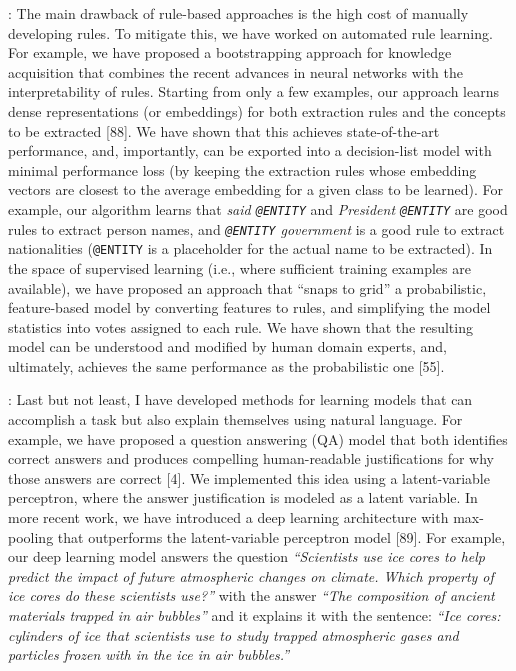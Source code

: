 \documentclass[10pt]{article}
\begin{document}
{}: The main drawback of rule-based approaches is the high cost of manually developing rules. To mitigate this, we have worked on automated rule learning. 
For example, we have proposed a bootstrapping approach for knowledge acquisition that combines the recent advances in neural networks with the interpretability of rules. Starting from only a few examples, our approach learns dense representations (or embeddings) for both extraction rules and the concepts to be extracted [88]. We have shown that this achieves state-of-the-art performance, and, importantly, can be exported into a decision-list model with minimal performance loss (by keeping the extraction rules whose embedding vectors are closest to the average embedding for a given class to be learned). 
For example, our algorithm learns that {\em said {\tt @ENTITY}} and {\em President {\tt @ENTITY}} are good rules to extract person names, and {\em {\tt  @ENTITY} government} is a good rule to extract nationalities ({\tt @ENTITY} is a placeholder for the actual name to be extracted).
%
In the space of supervised learning (i.e., where sufficient training examples are available), we have proposed an approach that ``snaps to grid'' a probabilistic, feature-based model by converting features to rules, and simplifying the model statistics into votes assigned to each rule. 
We have shown that the resulting model can be understood and modified by human domain experts, and, ultimately, achieves the same performance as the probabilistic one [55].  

{}: 
Last but not least, I have developed methods for learning models that can accomplish a task but also explain themselves using natural language.
For example, we have proposed a question answering (QA) model that both identifies correct answers and produces compelling human-readable justifications for why those answers are correct [4]. %
We implemented this idea using a latent-variable perceptron, where the answer justification is modeled as a latent variable. In more recent work, we have introduced a deep learning architecture with max-pooling that outperforms the latent-variable perceptron model [89]. 
For example, our deep learning model answers the question {\em ``Scientists use ice cores to help predict the impact of
future atmospheric changes on climate. Which property of ice cores do these scientists use?''} with the answer {\em ``The composition of ancient materials trapped in air bubbles''} and it explains it with the sentence: {\em ``Ice cores: cylinders of ice that scientists use to study trapped atmospheric gases and particles frozen with in the ice in air bubbles.''}
\end{document}
